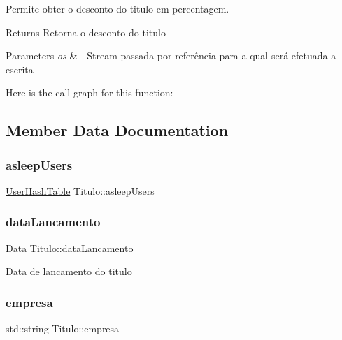 Permite obter o desconto do titulo em percentagem. 

\begin{DoxyReturn}{Returns}
Retorna o desconto do titulo 
\end{DoxyReturn}

\begin{DoxyParams}{Parameters}
{\em os} & -\/ Stream passada por referência para a qual será efetuada a escrita \\
\hline
\end{DoxyParams}
Here is the call graph for this function\+:


\subsection{Member Data Documentation}
\mbox{\label{class_titulo_a84e7b9dc58fbba5f048a57a0878a43e8}} 
\subsubsection{\texorpdfstring{asleep\+Users}{asleepUsers}}
{\footnotesize\ttfamily \mbox{\hyperlink{_titulo_8h_a0996281e9e5d419736dec228200cfdc5}{User\+Hash\+Table}} Titulo\+::asleep\+Users\hspace{0.3cm}{\ttfamily [protected]}}

\mbox{\label{class_titulo_ae540ddf2c607eb0e4de29eb8c0cca7f0}} 
\subsubsection{\texorpdfstring{data\+Lancamento}{dataLancamento}}
{\footnotesize\ttfamily \mbox{\hyperlink{class_data}{Data}} Titulo\+::data\+Lancamento\hspace{0.3cm}{\ttfamily [protected]}}

\mbox{\hyperlink{class_data}{Data}} de lancamento do titulo \mbox{\label{class_titulo_a91510c440dc8583d60d88ea02f4eb1b6}} 
\subsubsection{\texorpdfstring{empresa}{empresa}}
{\footnotesize\ttfamily std\+::string Titulo\+::empresa\hspace{0.3cm}{\ttfamily [protected]}}

